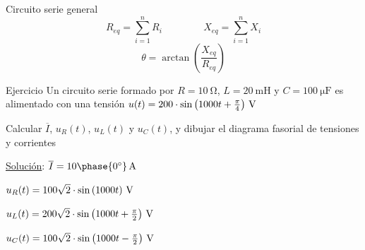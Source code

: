\documentclass[aspectratio=169, usenames,svgnames,dvipsnames]{beamer}
\begin{document}
\begin{frame}{Circuito serie general}
    \vspace{-2mm}
	\begin{equation*}
		R_{eq}=\sum_{i=1}^n R_i\,\qquad \qquad X_{eq}=\sum_{i=1}^n X_i
	\end{equation*}
	\begin{equation*}
		\theta=\arctan\left(\dfrac{X_{eq}}{R_{eq}}\right)
	\end{equation*}
\end{frame}


\begin{frame}{Ejercicio}
    \vspace{15mm}
    Un circuito serie formado por $R=\qty{10}{\ohm}$, $L=\qty{20}{\milli\henry}$ y $C=\qty{100}{\micro\farad}$ es alimentado con una tensión $u(t)=\qty[parse-numbers = false]{200\cdot\sin\left(1000t+\frac{\pi}{4}\right)}{\volt}$ 

    \vspace{5mm}
    Calcular $\overline{I}$, ${u_R(t)}$, $u_L(t)$ y $u_C(t)$, y dibujar el diagrama fasorial de tensiones y corrientes

    \vspace{17mm}
    \small{\alert{\href{https://raw.githubusercontent.com/ETSIDI-IE/tc/master/docs/ejercicios_clase/TC1_02_Ejemplo_2_5_libro_LBB.pdf}{Solución}}: $\overline{I} = 10\phase{\ang{0}} \,\si{\ampere}$ 

    \hspace{16mm}$u_R(t)=\qty[parse-numbers = false]{100 \sqrt2 \cdot\sin\left(1000t\right)}{\volt}$

    \hspace{16mm}$u_L(t)=\qty[parse-numbers = false]{200 \sqrt2 \cdot\sin\left(1000t+\frac{\pi}{2}\right)}{\volt}$

    \hspace{16mm}$u_C(t)=\qty[parse-numbers = false]{100 \sqrt2 \cdot\sin\left(1000t-\frac{\pi}{2}\right)}{\volt}$}
\end{frame}

\end{document}
